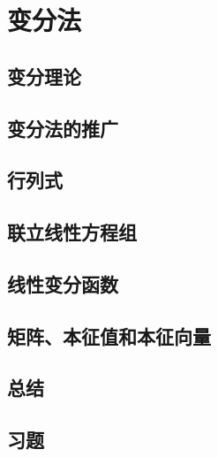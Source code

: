 \chapter{变分法}
\label{chap:8}
\section{变分理论}
\label{sec:8.1 The Variation Theorem}

\section{变分法的推广}
\label{sec:8.2 Extension of the Variational Method}

\section{行列式}
\label{sec:8.3 Determinants}

\section{联立线性方程组}
\label{sec:8.4 Simultaneous Linear Equations}

\section{线性变分函数}
\label{sec:8.5 Linear Variational Functions}

\section{矩阵、本征值和本征向量}
\label{sec:8.6 Matrices, Eigenvalues, and Eigenvectors}

\section*{总结}

\section*{习题}